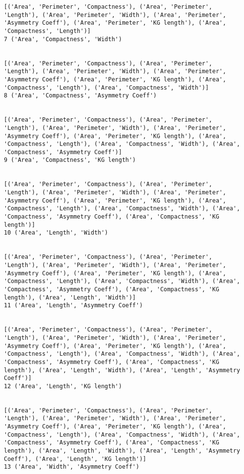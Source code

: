 \documentclass[11pt]{article}
\begin{document}
\begin{Verbatim}[commandchars=\\\{\}]
[('Area', 'Perimeter', 'Compactness'), ('Area', 'Perimeter', 'Length'), ('Area', 'Perimeter', 'Width'), ('Area', 'Perimeter', 'Asymmetry Coeff'), ('Area', 'Perimeter', 'KG length'), ('Area', 'Compactness', 'Length')]
7 ('Area', 'Compactness', 'Width')


[('Area', 'Perimeter', 'Compactness'), ('Area', 'Perimeter', 'Length'), ('Area', 'Perimeter', 'Width'), ('Area', 'Perimeter', 'Asymmetry Coeff'), ('Area', 'Perimeter', 'KG length'), ('Area', 'Compactness', 'Length'), ('Area', 'Compactness', 'Width')]
8 ('Area', 'Compactness', 'Asymmetry Coeff')


[('Area', 'Perimeter', 'Compactness'), ('Area', 'Perimeter', 'Length'), ('Area', 'Perimeter', 'Width'), ('Area', 'Perimeter', 'Asymmetry Coeff'), ('Area', 'Perimeter', 'KG length'), ('Area', 'Compactness', 'Length'), ('Area', 'Compactness', 'Width'), ('Area', 'Compactness', 'Asymmetry Coeff')]
9 ('Area', 'Compactness', 'KG length')


[('Area', 'Perimeter', 'Compactness'), ('Area', 'Perimeter', 'Length'), ('Area', 'Perimeter', 'Width'), ('Area', 'Perimeter', 'Asymmetry Coeff'), ('Area', 'Perimeter', 'KG length'), ('Area', 'Compactness', 'Length'), ('Area', 'Compactness', 'Width'), ('Area', 'Compactness', 'Asymmetry Coeff'), ('Area', 'Compactness', 'KG length')]
10 ('Area', 'Length', 'Width')


[('Area', 'Perimeter', 'Compactness'), ('Area', 'Perimeter', 'Length'), ('Area', 'Perimeter', 'Width'), ('Area', 'Perimeter', 'Asymmetry Coeff'), ('Area', 'Perimeter', 'KG length'), ('Area', 'Compactness', 'Length'), ('Area', 'Compactness', 'Width'), ('Area', 'Compactness', 'Asymmetry Coeff'), ('Area', 'Compactness', 'KG length'), ('Area', 'Length', 'Width')]
11 ('Area', 'Length', 'Asymmetry Coeff')


[('Area', 'Perimeter', 'Compactness'), ('Area', 'Perimeter', 'Length'), ('Area', 'Perimeter', 'Width'), ('Area', 'Perimeter', 'Asymmetry Coeff'), ('Area', 'Perimeter', 'KG length'), ('Area', 'Compactness', 'Length'), ('Area', 'Compactness', 'Width'), ('Area', 'Compactness', 'Asymmetry Coeff'), ('Area', 'Compactness', 'KG length'), ('Area', 'Length', 'Width'), ('Area', 'Length', 'Asymmetry Coeff')]
12 ('Area', 'Length', 'KG length')


[('Area', 'Perimeter', 'Compactness'), ('Area', 'Perimeter', 'Length'), ('Area', 'Perimeter', 'Width'), ('Area', 'Perimeter', 'Asymmetry Coeff'), ('Area', 'Perimeter', 'KG length'), ('Area', 'Compactness', 'Length'), ('Area', 'Compactness', 'Width'), ('Area', 'Compactness', 'Asymmetry Coeff'), ('Area', 'Compactness', 'KG length'), ('Area', 'Length', 'Width'), ('Area', 'Length', 'Asymmetry Coeff'), ('Area', 'Length', 'KG length')]
13 ('Area', 'Width', 'Asymmetry Coeff')



\end{Verbatim}
\end{document}
